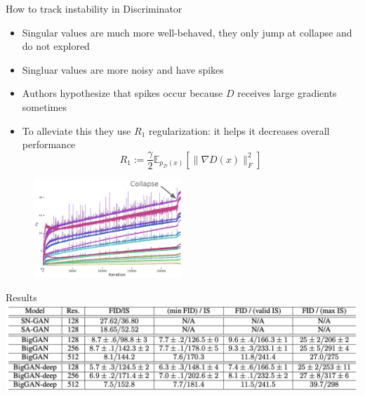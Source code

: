 \documentclass[10pt]{beamer}
\begin{document}
\begin{frame}{How to track instability in Discriminator}
    \begin{itemize}
        \item\pause Singular values are much more well-behaved, they only jump at collapse and do not explored
        \item\pause Singluar values are more noisy and have spikes
        \item\pause Authors hypothesize that spikes occur because $D$ receives large gradients sometimes
        \item\pause To alleviate this they use $R_1$ regularization: it helps it decreases overall performance
        \begin{equation}
            R_{1}:=\frac{\gamma}{2} \mathbb{E}_{p_{\mathcal{D}}(x)}\left[\|\nabla D(x)\|_{F}^{2}\right]
        \end{equation}
    \end{itemize}
    
    \begin{figure}
        \centering
        \includegraphics[width=0.5\textwidth]{images/biggan-singular-values-discriminator}
    \end{figure}
\end{frame}

\begin{frame}{Results}
    \centering
    \includegraphics[width=\textwidth]{images/biggan-results}
\end{frame}
\end{document}
